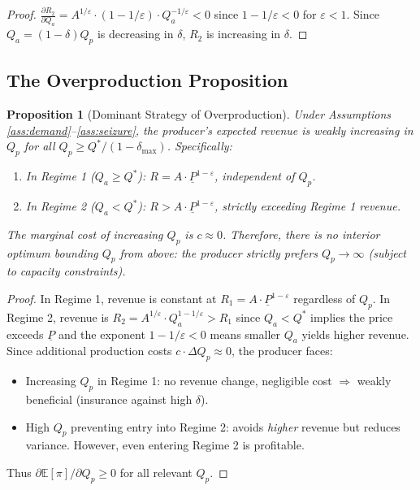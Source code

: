 \documentclass[12pt, a4paper]{article}
\newtheorem{proposition}{Proposition}
\begin{document}
\begin{proof}
$\frac{\partial R_2}{\partial Q_a} = A^{1/\varepsilon} \cdot (1 - 1/\varepsilon) \cdot Q_a^{-1/\varepsilon} < 0$ since $1 - 1/\varepsilon < 0$ for $\varepsilon < 1$. Since $Q_a = (1-\delta)Q_p$ is decreasing in $\delta$, $R_2$ is increasing in $\delta$.
\end{proof}

\subsection{The Overproduction Proposition}

\begin{proposition}[Dominant Strategy of Overproduction]
\label{prop:main}
Under Assumptions \ref{ass:demand}--\ref{ass:seizure}, the producer's expected revenue is weakly increasing in $Q_p$ for all $Q_p \geq Q^*/(1-\delta_{\max})$. Specifically:
\begin{enumerate}[label=(\roman*)]
    \item In Regime 1 ($Q_a \geq Q^*$): $R = A \cdot \underline{P}^{1-\varepsilon}$, independent of $Q_p$.
    \item In Regime 2 ($Q_a < Q^*$): $R > A \cdot \underline{P}^{1-\varepsilon}$, strictly exceeding Regime 1 revenue.
\end{enumerate}
The marginal cost of increasing $Q_p$ is $c \approx 0$. Therefore, there is no interior optimum bounding $Q_p$ from above: the producer strictly prefers $Q_p \to \infty$ (subject to capacity constraints).
\end{proposition}

\begin{proof}
In Regime 1, revenue is constant at $R_1 = A \cdot \underline{P}^{1-\varepsilon}$ regardless of $Q_p$. In Regime 2, revenue is $R_2 = A^{1/\varepsilon} \cdot Q_a^{1-1/\varepsilon} > R_1$ since $Q_a < Q^*$ implies the price exceeds $\underline{P}$ and the exponent $1-1/\varepsilon < 0$ means smaller $Q_a$ yields higher revenue. Since additional production costs $c \cdot \Delta Q_p \approx 0$, the producer faces:
\begin{itemize}
    \item Increasing $Q_p$ in Regime 1: no revenue change, negligible cost $\Rightarrow$ weakly beneficial (insurance against high $\delta$).
    \item High $Q_p$ preventing entry into Regime 2: avoids \textit{higher} revenue but reduces variance. However, even entering Regime 2 is profitable.
\end{itemize}
Thus $\partial \mathbb{E}[\pi] / \partial Q_p \geq 0$ for all relevant $Q_p$.
\end{proof}
\end{document}
